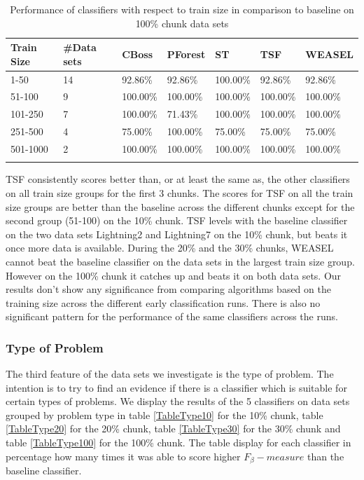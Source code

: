 \begin{table}[hp!]
	\setlength\extrarowheight{2pt} %
	\begin{tabularx}{\textwidth}{|X|X|X|X|X|X|X|}
	\hline
	\textbf{Train Size} & \textbf{\#Data sets} & \textbf{CBoss} & \textbf{PForest} & \textbf{ST} & \textbf{TSF} & \textbf{WEASEL} \\ \hline
		1-50 & 14 & 92.86\% & 92.86\% & 100.00\% & 92.86\% & 92.86\% \\ \hline
		51-100 & 9 & 100.00\% & 100.00\% & 100.00\% & 100.00\% & 100.00\% \\ \hline
		101-250 & 7 & 100.00\% & 71.43\% & 100.00\% & 100.00\% & 100.00\% \\ \hline
		251-500 & 4 & 75.00\% & 100.00\% & 75.00\% & 75.00\% & 75.00\% \\ \hline
		501-1000 & 2 &100.00\% & 100.00\% & 100.00\% & 100.00\% & 100.00\% \\ \hline
  \caption{Performance of classifiers with respect to train size in comparison to baseline on 100\% chunk data sets}
  \label{TableSize100}
  \end{tabularx}
\end{table}

TSF consistently scores better than, or at least the same as, the other classifiers on all train size groups for the first 3 chunks.
The scores for TSF on all the train size groups are better than the baseline across the different chunks except for the second group (51-100) on the 10\% chunk.
TSF levels with the baseline classifier on the two data sets Lightning2 and Lightning7 on the 10\% chunk, but beats it once more data is available.
During the 20\% and the 30\% chunks, WEASEL cannot beat the baseline classifier on the data sets in the largest train size group.
However on the 100\% chunk it catches up and beats it on both data sets.
Our results don't show any significance from comparing algorithms based on the training size across the different early classification runs.
There is also no significant pattern for the performance of the same classifiers across the runs.


\subsubsection{Type of Problem}
The third feature of the data sets we investigate is the type of problem.
The intention is to try to find an evidence if there is a classifier which is suitable for certain types of problems.
We display the results of the 5 classifiers on data sets grouped by problem type in table \ref{TableType10} for the 10\% chunk, table \ref{TableType20} for the 20\% chunk, table \ref{TableType30} for the 30\% chunk and table \ref{TableType100} for the 100\% chunk.
The table display for each classifier in percentage how many times it was able to score higher $F_{\beta}-measure$ than the baseline classifier.

